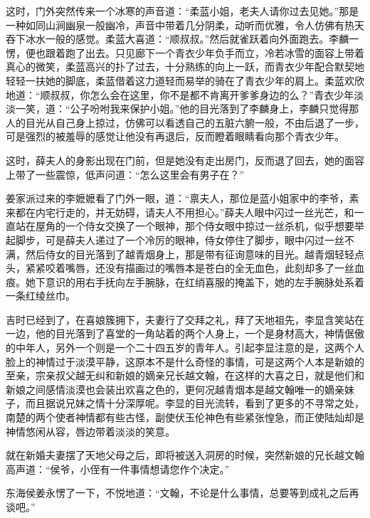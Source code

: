 这时，门外突然传来一个冰寒的声音道：“柔蓝小姐，老夫人请你过去见她。”那是一种如同山涧幽泉一般幽冷，声音中带着几分阴柔，动听而优雅，令人仿佛有热天吞下冰水一般的感觉。柔蓝大喜道：“顺叔叔。”然后就雀跃着向外面跑去。李麟一愣，便也跟着跑了出去。只见廊下一个青衣少年负手而立，冷若冰雪的面容上带着真心的微笑，柔蓝高兴的扑了过去，十分熟练的向上一跃，而青衣少年配合默契地轻轻一扶她的脚底，柔蓝借着这力道轻而易举的骑在了青衣少年的肩上。柔蓝欢欣地道：“顺叔叔，你怎么会在这里，你不是都不肯离开爹爹身边的么？”青衣少年淡淡一笑，道：“公子吩咐我来保护小姐。”他的目光落到了李麟身上，李麟只觉得那人的目光从自己身上掠过，仿佛可以看透自己的五脏六腑一般，不由后退了一步，可是强烈的被羞辱的感觉让他没有再退后，反而瞪着眼睛看向那个青衣少年。

这时，薛夫人的身影出现在门前，但是她没有走出房门，反而退了回去，她的面容上带了一些震惊，低声问道：“怎么这里会有男子在？”

姜家派过来的李嬷嬷看了门外一眼，道：“禀夫人，那位是蓝小姐家中的李爷，素来都在内宅行走的，并无妨碍，请夫人不用担心。”薛夫人眼中闪过一丝光芒，和一直站在屋角的一个侍女交换了一个眼神，那个侍女眼中掠过一丝杀机，似乎想要举起脚步，可是薛夫人递过了一个冷厉的眼神，侍女停住了脚步，眼中闪过一丝不满，然后侍女的目光落到了越青烟身上，那是带有征询意味的目光。越青烟轻轻点头，紧紧咬着嘴唇，还没有描画过的嘴唇本是苍白的全无血色，此刻却多了一丝血痕。她下意识的用右手抚向左手腕脉，在红绡喜服的掩盖下，她的左手腕脉处系着一条红绫丝巾。

吉时已经到了，在喜娘簇拥下，夫妻行了交拜之礼，拜了天地祖先，李显含笑站在一边，他的目光落到了喜堂的一角站着的两个人身上，一个是身材高大，神情倨傲的中年人，另外一个则是一个二十四五岁的青年人。引起李显注意的是，这两个人脸上的神情过于淡漠平静，这原本不是什么奇怪的事情，可是这两个人本是新娘的至亲，宗亲叔父越无纠和新娘的嫡亲兄长越文翰，在这样的大喜之日，就是他们和新娘之间感情淡漠也会装出欢喜之色的，更何况越青烟本是越文翰唯一的嫡亲妹子，而且据说兄妹之情十分深厚呢。李显的目光流转，看到了更多的不寻常之处，南楚的两个使者神情都有些古怪，副使伏玉伦神色有些紧张惶急，而正使陆灿却是神情悠闲从容，唇边带着淡淡的笑意。

就在新婚夫妻摆了天地父母之后，即将被送入洞房的时候，突然新娘的兄长越文翰高声道：“侯爷，小侄有一件事情想请您作个决定。”

东海侯姜永愣了一下，不悦地道：“文翰，不论是什么事情，总要等到成礼之后再谈吧。”

